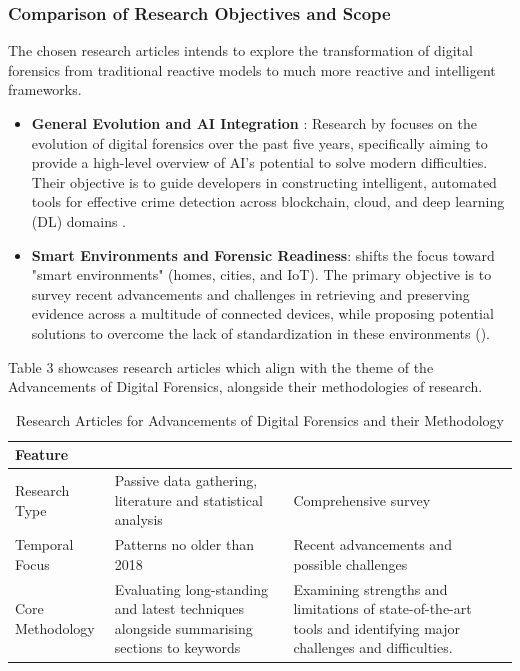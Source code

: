\documentclass[12pt,a4paper]{article}
\begin{document}
\subsubsection{Comparison of Research Objectives and Scope}

The chosen research articles intends to explore the transformation of digital forensics from traditional reactive models to much more reactive and intelligent frameworks.

\begin{itemize}
    \item \textbf{General Evolution and AI Integration} : Research by \cite{vaddi2024enhancements} focuses on the evolution of digital forensics over the past five years, specifically aiming to provide a high-level overview of AI’s potential to solve modern difficulties. Their objective is to guide developers in constructing intelligent, automated tools for effective crime detection across blockchain, cloud, and deep learning (DL) domains \cite{vaddi2024enhancements}.
    \item \textbf{Smart Environments and Forensic Readiness}: \cite{alenezi2023digital} shifts the focus toward "smart environments" (homes, cities, and IoT). The primary objective is to survey recent advancements and challenges in retrieving and preserving evidence across a multitude of connected devices, while proposing potential solutions to overcome the lack of standardization in these environments (\cite{alenezi2023digital}).
\end{itemize}

Table 3 showcases research articles which align with the theme of the Advancements of Digital Forensics, alongside their methodologies of research.

\begin{table}[H]
\caption{Research Articles for Advancements of Digital Forensics and their Methodology}
\label{tab:inclusion-exclusion}

\fontsize{10pt}{12pt}\selectfont
\begin{tabularx}{\textwidth}{|p{3cm}|X|X|X|}
\hline
\centering\textbf {Feature} &
\centering\textbf{\cite{vaddi2024enhancements}} &
\centering\textbf{\cite{alenezi2023digital}}
\tabularnewline
\hline

\centering Research Type  &
\centering Passive data gathering, literature and statistical analysis &
\centering Comprehensive survey
\tabularnewline
\hline

\centering Temporal Focus  &
\centering Patterns no older than 2018 &
\centering Recent advancements and possible challenges
\tabularnewline
\hline

\centering Core Methodology &
\centering Evaluating long-standing and latest techniques alongside summarising sections to keywords &
\centering Examining strengths and limitations of state-of-the-art tools and identifying major challenges and difficulties.
\tabularnewline
\hline

\end{tabularx}

\end{table}
\end{document}
